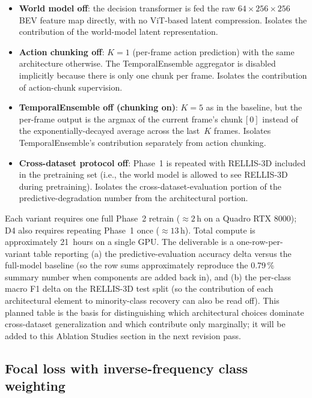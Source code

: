 \documentclass[sensors,article,submit,pdftex,moreauthors]{Definitions/mdpi}
\providecommand{\DIFadd}[1]{{\protect\color{red}#1}} %
\begin{document}
\begin{itemize}
    \item[\textbf{\DIFadd{D1}}] \textbf{\DIFadd{World model off}}\DIFadd{: the decision transformer is fed the raw $64\times256\times256$ BEV feature map directly, with no ViT-based latent compression. Isolates the contribution of the world-model latent representation.
    }\item[\textbf{\DIFadd{D2}}] \textbf{\DIFadd{Action chunking off}}\DIFadd{: $K{=}1$ (per-frame action prediction) with the same architecture otherwise. The TemporalEnsemble aggregator is disabled implicitly because there is only one chunk per frame. Isolates the contribution of action-chunk supervision.
    }\item[\textbf{\DIFadd{D3}}] \textbf{\DIFadd{TemporalEnsemble off (chunking on)}}\DIFadd{: $K{=}5$ as in the baseline, but the per-frame output is the argmax of the current frame's chunk\,$[0]$ instead of the exponentially-decayed average across the last~$K$ frames. Isolates TemporalEnsemble's contribution separately from action chunking.
    }\item[\textbf{\DIFadd{D4}}] \textbf{\DIFadd{Cross-dataset protocol off}}\DIFadd{: Phase~1 is repeated with RELLIS-3D included in the pretraining set (i.e., the world model is allowed to see RELLIS-3D during pretraining). Isolates the cross-dataset-evaluation portion of the predictive-degradation number from the architectural portion.
}\end{itemize}

\DIFadd{Each variant requires one full Phase~2 retrain ($\approx 2$\,h on a Quadro RTX 8000); D4 also requires repeating Phase~1 once ($\approx 13$\,h). Total compute is approximately 21~hours on a single GPU. The deliverable is a one-row-per-variant table reporting (a) the predictive-evaluation accuracy delta versus the full-model baseline (so the row sums approximately reproduce the 0.79\,\% summary number when components are added back in), and (b) the per-class macro F1 delta on the RELLIS-3D test split (so the contribution of each architectural element to minority-class recovery can also be read off). This planned table is the basis for distinguishing which architectural choices dominate cross-dataset generalization and which contribute only marginally; it will be added to this Ablation Studies section in the next revision pass.
}

\subsection{\DIFadd{Focal loss with inverse-frequency class weighting}}
\label{sec:ablation_focal}
\end{document}
